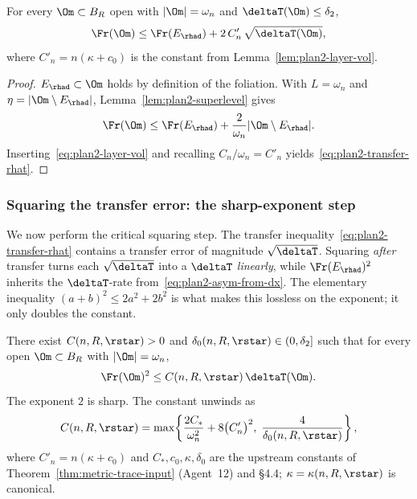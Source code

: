 \begin{corollary}
\label{cor:plan2-transfer-rhat}
For every $\Om\subset B_R$ open with $|\Om|=\omega_n$ and
$\deltaT(\Om)\le\delta_2$,
\begin{equation}\label{eq:plan2-transfer-rhat}
   \Fr(\Om)\le \Fr(E_{\rhad})+2\,C'_n\,\sqrt{\deltaT(\Om)},
\end{equation}
where $C'_n=n(\kappa+c_0)$ is the constant from
Lemma~\ref{lem:plan2-layer-vol}.
\end{corollary}

\begin{proof}
$E_{\rhad}\subset\Om$ holds by definition of the foliation. With
$L=\omega_n$ and $\eta=|\Om\setminus E_{\rhad}|$,
Lemma~\ref{lem:plan2-superlevel} gives
\[
   \Fr(\Om)\le \Fr(E_{\rhad})+\frac{2}{\omega_n}|\Om\setminus E_{\rhad}|.
\]
Inserting~\eqref{eq:plan2-layer-vol} and recalling
$C_n/\omega_n=C'_n$ yields~\eqref{eq:plan2-transfer-rhat}.
\end{proof}

\subsubsection{Squaring the transfer error: the sharp-exponent step}
\label{sssec:plan2-squaring}

We now perform the critical squaring step. The transfer
inequality~\eqref{eq:plan2-transfer-rhat} contains a transfer error
of magnitude $\sqrt{\deltaT}$. Squaring \emph{after} transfer turns
each $\sqrt{\deltaT}$ into a $\deltaT$ \emph{linearly}, while
$\Fr(E_{\rhad})^2$ inherits the $\deltaT$-rate
from~\eqref{eq:plan2-asym-from-dx}. The elementary inequality
$(a+b)^2\le 2a^2+2b^2$ is what makes this lossless on the exponent;
it only doubles the constant.

\begin{theorem}
\label{thm:plan2-bdd-SV}
There exist $C(n,R,\rstar)>0$ and
$\delta_0(n,R,\rstar)\in(0,\delta_2]$ such that for every open
$\Om\subset B_R$ with $|\Om|=\omega_n$,
\begin{equation}\label{eq:plan2-bdd-SV}
   \Fr(\Om)^{2}\le C(n,R,\rstar)\,\deltaT(\Om).
\end{equation}
The exponent $2$ is sharp. The constant unwinds as
\begin{equation}\label{eq:plan2-C-final}
   C(n,R,\rstar)
   =\max\!\left\{
     \frac{2C_*}{\omega_n^{2}}+8\bigl(C'_n\bigr)^{2},\;
     \frac{4}{\delta_0(n,R,\rstar)}
   \right\},
\end{equation}
where $C'_n=n(\kappa+c_0)$ and $C_*,c_0,\kappa,\delta_0$ are the
upstream constants of
Theorem~\ref{thm:metric-trace-input} (Agent~12) and \S4.4;
$\kappa=\kappa(n,R,\rstar)$ is canonical.
\end{theorem}

